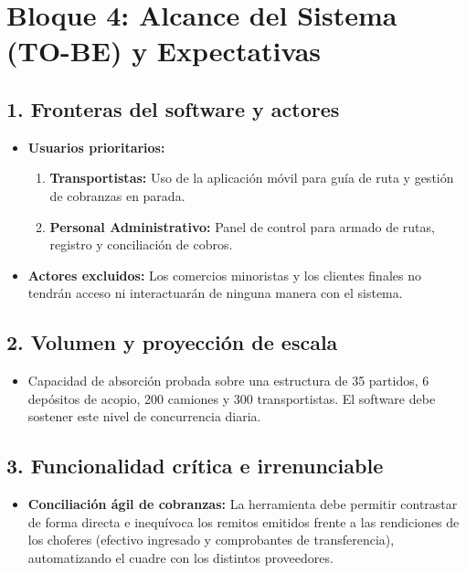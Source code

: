 \documentclass[11pt,a4paper]{article}
\begin{document}
\section*{Bloque 4: Alcance del Sistema (TO-BE) y Expectativas}

\subsection*{1. Fronteras del software y actores}
\begin{itemize}
  \item \textbf{Usuarios prioritarios:}
  \begin{enumerate}[label=\textbf{\arabic*.}]
    \item \textbf{Transportistas:} Uso de la aplicación móvil para guía de ruta y gestión de cobranzas en parada.
    \item \textbf{Personal Administrativo:} Panel de control para armado de rutas, registro y conciliación de cobros.
  \end{enumerate}
  \item \textbf{Actores excluidos:} Los comercios minoristas y los clientes finales no tendrán acceso ni interactuarán de ninguna manera con el sistema.
\end{itemize}

\subsection*{2. Volumen y proyección de escala}
\begin{itemize}
  \item Capacidad de absorción probada sobre una estructura de 35 partidos, 6 depósitos de acopio, 200 camiones y 300 transportistas. El software debe sostener este nivel de concurrencia diaria.
\end{itemize}

\subsection*{3. Funcionalidad crítica e irrenunciable}
\begin{itemize}
  \item \textbf{Conciliación ágil de cobranzas:} La herramienta debe permitir contrastar de forma directa e inequívoca los remitos emitidos frente a las rendiciones de los choferes (efectivo ingresado y comprobantes de transferencia), automatizando el cuadre con los distintos proveedores.
\end{itemize}
\end{document}
